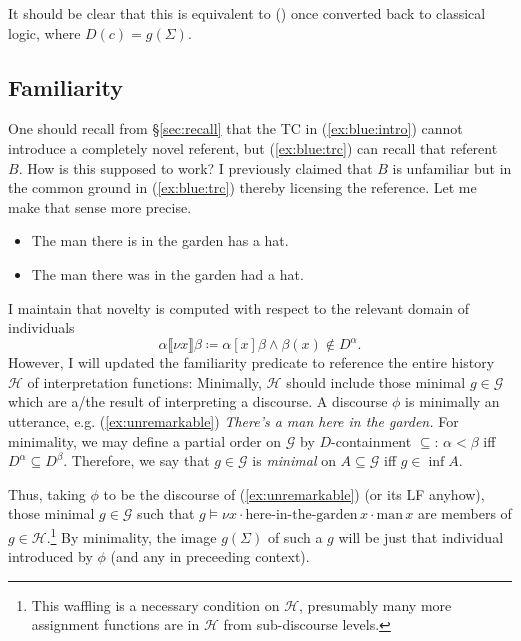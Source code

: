 \documentclass[11pt]{article}
\begin{document}
It should be clear that this is equivalent to () once converted back to classical logic, where \(D(c) = g(\Sigma)\).

\subsection{Familiarity}\label{sec:familiarity}
One should recall from \S\ref{sec:recall} that the TC in (\ref{ex:blue:intro}) cannot introduce a completely novel referent, but (\ref{ex:blue:trc}) can recall that referent \(B\). How is this supposed to work? I previously claimed that \(B\) is unfamiliar but in the common ground in (\ref{ex:blue:trc}) thereby licensing the reference. Let me make that sense more precise.

\begin{itemize}
	\item[(\ref{ex:blue:intro})] The man there is in the garden has a hat.
	\item[(\ref{ex:blue:trc})] The man there was in the garden had a hat.
\end{itemize}

I maintain that novelty is computed with respect to the relevant domain of individuals
\[\alpha\llbracket \nu x \rrbracket\beta \coloneqq \alpha[x]\beta \land \beta(x) \not\in D^\alpha.\]
However, I will updated the familiarity predicate to reference the entire history \(\mathcal{H}\) of interpretation functions: Minimally, \(\mathcal{H}\) should include those minimal \(g \in \mathcal{G}\) which are a/the result of interpreting a discourse. A discourse \(\phi\) is minimally an utterance, e.g. (\ref{ex:unremarkable}) \textit{There's a man here in the garden.} For minimality, we may define a partial order on \(\mathcal{G}\) by \(D\)-containment \(\subseteq\): \(\alpha < \beta\) iff \(D^\alpha \subseteq D^\beta\). Therefore, we say that \(g \in \mathcal{G}\) is \textit{minimal} on \(A \subseteq \mathcal{G}\) iff \(g \in \inf A\).

Thus, taking \(\phi\) to be the discourse of (\ref{ex:unremarkable}) (or its LF anyhow), those minimal \(g \in \mathcal{G}\) such that \(g \models \nu x \cdot \text{here-in-the-garden}\,x \cdot \text{man}\,x\) are members of \(g \in \mathcal{H}\).\footnote{This waffling is a necessary condition on \(\mathcal{H}\), presumably many more assignment functions are in \(\mathcal{H}\) from sub-discourse levels.} By minimality, the image \(g(\Sigma)\) of such a \(g\) will be just that individual introduced by \(\phi\) (and any in preceeding context).
\end{document}
